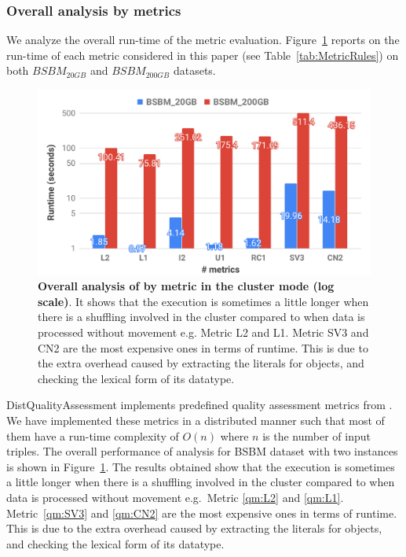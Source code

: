 \subsubsection{Overall analysis by metrics}
We analyze the overall run-time of the metric evaluation.
Figure~\ref{fig:distqualityassessment-overall-analysis} reports on the run-time of each metric considered in this paper (see Table~\ref{tab:MetricRules}) on both $BSBM_{20GB}$ and $BSBM_{200GB}$ datasets.

\begin{figure}
\includegraphics[width=1.0\columnwidth]{images/5_distqualityassessment/distqualityassessment-overall-analysis.pdf}
\caption{\textbf{Overall analysis of by metric in the cluster mode (log scale)}.
It shows that the execution is sometimes a little longer when there is a shuffling involved in the cluster compared to when data is processed without movement e.g. Metric L2 and L1. 
Metric SV3 and CN2 are the most expensive ones in terms of runtime. This is due to the extra overhead caused by extracting the literals for objects, and checking the lexical form of its datatype.
}
\label{fig:distqualityassessment-overall-analysis}
\end{figure}

DistQualityAssessment implements predefined quality assessment metrics from \cite{zaveri2015quality}. 
We have implemented these metrics in a distributed manner such that most of them have a run-time complexity of $O(n)$ where $n$ is the number of input triples.
The overall performance of analysis for BSBM dataset with two instances is shown in Figure~\ref{fig:distqualityassessment-overall-analysis}.
The results obtained show that the execution is sometimes a little longer when there is a shuffling involved in the cluster compared to when data is processed without movement e.g.~Metric \ref{qm:L2} and \ref{qm:L1}.
Metric~\ref{qm:SV3} and \ref{qm:CN2} are the most expensive ones in terms of runtime.
This is due to the extra overhead caused by extracting the literals for objects, and checking the lexical form of its datatype. 

